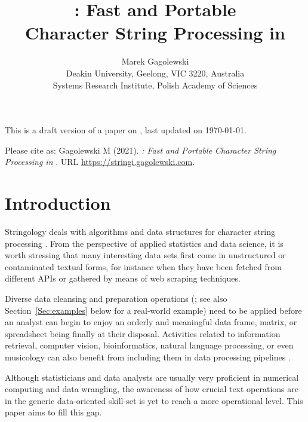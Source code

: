 \documentclass[nojss]{jss}
\author{Marek Gagolewski\\
Deakin University, Geelong, VIC 3220, Australia\\
Systems Research Institute, Polish Academy of Sciences
}
\title{\pkg{stringi}: Fast and Portable\\Character String
Processing in \proglang{R}}
\begin{document}
{\color{blue}
This is a draft version of a paper on , last updated on \today.

Please cite as:
Gagolewski M (2021).
\textit{: Fast and Portable Character String Processing in }.
URL \url{https://stringi.gagolewski.com}.
}




\section{Introduction}\label{Sec:intro}

Stringology \citep{stringology} deals with algorithms and data structures
for character string processing \citep{speechlangproc,szpankowski}.
From the perspective of applied statistics and data science,
it is worth stressing that many interesting data sets
first come in unstructured or contaminated textual forms,
for instance when they have been fetched from different APIs or gathered
by means of web scraping techniques.

Diverse data cleansing and preparation operations
(\citealp{datacleaning,cleanr}; see also
Section~\ref{Sec:examples} below for a real-world example)
need to be applied before an analyst can begin to enjoy
an orderly and meaningful data frame, matrix, or spreadsheet being finally
at their disposal.
Activities related to information retrieval, computer vision,
bioinformatics, natural language processing, or even musicology
can also benefit from including them
in data processing pipelines \citep{speechlangproc,genome}.


Although statisticians and data analysts are usually
very proficient in numerical computing and data wrangling,
the awareness of how crucial text operations are in the generic
data-oriented skill-set is yet to reach a more operational
level. This paper aims to fill this gap.
\end{document}
